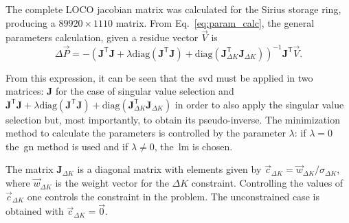 The complete LOCO jacobian matrix was calculated for the Sirius storage ring, producing a $89920 \times 1110$ matrix. From Eq.~\eqref{eq:param_calc}, the general parameters calculation, given a residue vector $\vec{V}$ is
\begin{equation*}
\Delta \vec{P} = - \left(\mathbf{J}^{\mathsf{T}}\mathbf{J} + \lambda \mathrm{diag}\left(\mathbf{J}^{\mathsf{T}}\mathbf{J}\right) + \mathrm{diag}\left(\mathbf{J}^{\mathsf{T}}_{\Delta K}\mathbf{J}_{\Delta K}\right) \right)^{-1}\mathbf{J}^{\mathsf{T}}\vec{V}.
\end{equation*}

From this expression, it can be seen that the~\gls{svd} must be applied in two matrices: $\mathbf{J}$ for the case of singular value selection and $\mathbf{J}^{\mathsf{T}}\mathbf{J} + \lambda \mathrm{diag}\left(\mathbf{J}^{\mathsf{T}}\mathbf{J}\right) + \mathrm{diag}\left(\mathbf{J}^{\mathsf{T}}_{\Delta K}\mathbf{J}_{\Delta K}\right)$ in order to also apply the singular value selection but, most importantly, to obtain its pseudo-inverse. The minimization method to calculate the parameters is controlled by the parameter $\lambda$: if $\lambda = 0$ the~\gls{gn} method is used and if $\lambda \neq 0$, the~\gls{lm} is chosen.

The matrix $\mathbf{J}_{\Delta K}$ is a diagonal matrix with elements given by $\vec{c}_{\Delta K} = \vec{w}_{\Delta K}/\sigma_{\Delta K}$, where $\vec{w}_{\Delta K}$ is the weight vector for the ${\Delta K}$ constraint. Controlling the values of $\vec{c}_{\Delta K}$ one controls the constraint in the problem. The unconstrained case is obtained with $\vec{c}_{\Delta K} = \vec{0}$.

